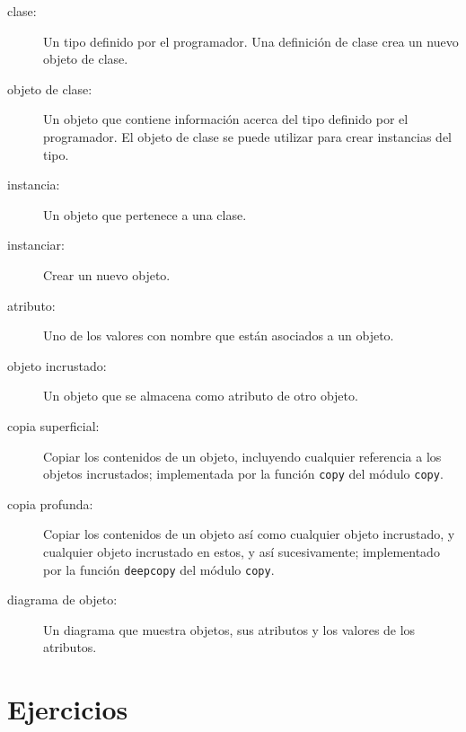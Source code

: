 \documentclass[10pt]{book}
\begin{document}
\begin{description}

\item[clase:] Un tipo definido por el programador.  Una definición de clase crea un nuevo
objeto de clase.

\item[objeto de clase:] Un objeto que contiene información acerca del
tipo definido por el programador.  El objeto de clase se puede utilizar para crear instancias
del tipo.

\item[instancia:] Un objeto que pertenece a una clase.

\item[instanciar:] Crear un nuevo objeto.

\item[atributo:] Uno de los valores con nombre que están asociados a un objeto.

\item[objeto incrustado:] Un objeto que se almacena como atributo
de otro objeto.

\item[copia superficial:] Copiar los contenidos de un objeto, incluyendo
cualquier referencia a los objetos incrustados;
implementada por la función {\tt copy} del módulo {\tt copy}.

\item[copia profunda:] Copiar los contenidos de un objeto así como cualquier
objeto incrustado, y cualquier objeto incrustado en estos, y así sucesivamente;
implementado por la función {\tt deepcopy} del módulo {\tt copy}.

\item[diagrama de objeto:] Un diagrama que muestra objetos, sus
atributos y los valores de los atributos.

\end{description}


\section{Ejercicios}
\end{document}
